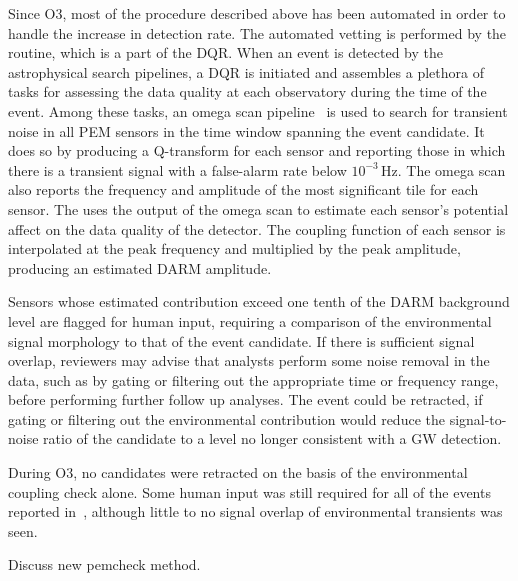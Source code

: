 Since \ac{O3}, most of the procedure described above has been automated in order to handle the increase in detection rate.
The automated vetting is performed by the  routine, which is a part of the \ac{DQR}.
When an event is detected by the astrophysical search pipelines, a \ac{DQR} is initiated and assembles a plethora of tasks for assessing the data quality at each observatory during the time of the event.
Among these tasks, an omega scan pipeline~\citep{Davis_2021, Chatterji_2004} is used to search for transient noise in all \ac{PEM} sensors in the time window spanning the event candidate.
It does so by producing a Q-transform for each sensor and reporting those in which there is a transient signal with a false-alarm rate below $10^{-3}$\,Hz.
The omega scan also reports the frequency and amplitude of the most significant tile for each sensor.
The  uses the output of the omega scan to estimate each sensor's potential affect on the data quality of the detector.
The coupling function of each sensor is interpolated at the peak frequency and multiplied by the peak amplitude, producing an estimated \ac{DARM} amplitude.

Sensors whose estimated contribution exceed one tenth of the \ac{DARM} background level are flagged for human input, requiring a comparison of the environmental signal morphology to that of the event candidate.
If there is sufficient signal overlap, reviewers may advise that analysts perform some noise removal in the data, such as by gating or filtering out the appropriate time or frequency range, before performing further follow up analyses.
The event could be retracted, if gating or filtering out the environmental contribution would reduce the signal-to-noise ratio of the candidate to a level no longer consistent with a GW detection.

During \ac{O3}, no candidates were retracted on the basis of the environmental coupling check alone.
Some human input was still required for all of the \XX events reported in~\citep{gwtc2}, although little to no signal overlap of environmental transients was seen.

{\color{red}
Discuss new pemcheck method.}
